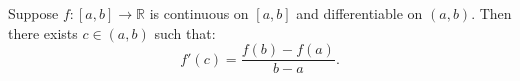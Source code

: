 Suppose $f: [a, b] \to \mathbb{R}$ is continuous on $[a, b]$ and differentiable on $(a, b)$. Then there exists $c \in (a, b)$ such that:
\[
f'(c) = \frac{f(b) - f(a)}{b - a}.
\]
